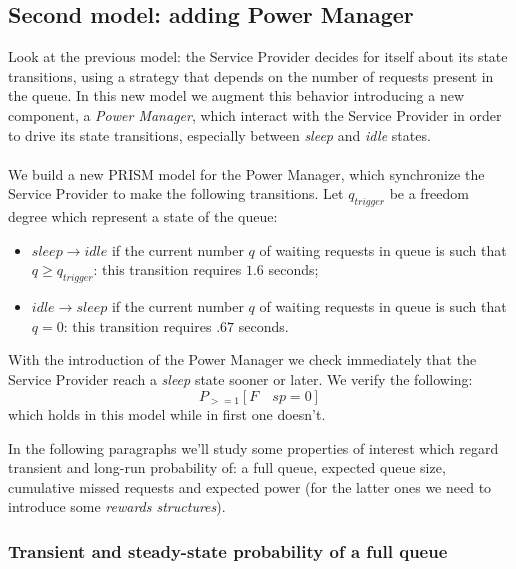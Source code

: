 \subsection{Second model: adding Power Manager}

Look at the previous model: the Service Provider decides for itself
about its state transitions, using a strategy that depends on the
number of requests present in the queue. In this new model we augment
this behavior introducing a new component, a \emph{Power Manager},
which interact with the Service Provider in order to drive its state
transitions, especially between \emph{sleep} and \emph{idle} states.
\\\\
We build a new PRISM model for the Power Manager, which synchronize
the Service Provider to make the following transitions. Let
$q_{trigger}$ be a freedom degree which represent a state of the
queue:
\begin{itemize}
\item $sleep \rightarrow idle$ if the current number $q$ of waiting
  requests in queue is such that $q \geq q_{trigger}$: this transition
  requires $1.6$ seconds;
\item $idle \rightarrow sleep$ if the current number $q$ of waiting
  requests in queue is such that $q = 0$: this transition requires
  $.67$ seconds.
\end{itemize}
With the introduction of the Power Manager we check immediately that
the Service Provider reach a \emph{sleep} state sooner or later. We
verify the following:
\begin{displaymath}
  P_{>=1} [ F\quad sp=0 ]
\end{displaymath}
which holds in this model while in first one doesn't.

In the following paragraphs we'll study some properties of interest
which regard transient and long-run probability of: a full queue,
expected queue size, cumulative missed requests and expected power (for
the latter ones we need to introduce some \emph{rewards structures}).

\subsubsection{Transient and steady-state probability of a full queue}

